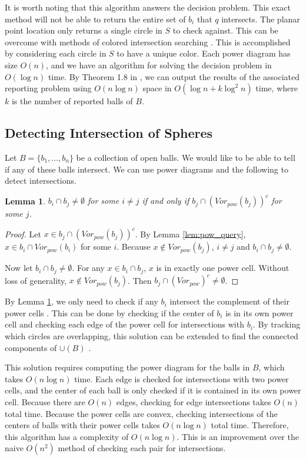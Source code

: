 \documentclass[a4paper, 11pt]{article}
\newtheorem{lemma}{Lemma}[section]
\begin{document}
It is worth noting that this algorithm answers the decision problem. This exact method will not be able to return the entire set of $b_i$ that $q$
intersects. The planar point location only returns a single circle in $S$ to check against. This can be overcome with methods of colored intersection
searching \cite{ravi}. This is accomplished by considering each circle in $S$ to have a unique color. Each power diagram has size $O(n)$, and we have
an algorithm for solving the decision problem in $O(\log n)$ time. By Theorem 1.8 in \cite{ravi}, we can output the results of the associated reporting problem using $O(n
\log n)$ space in $O(\log n +k \log^2 n)$ time, where $k$ is the number of reported balls of $B$.

\subsection{Detecting Intersection of Spheres}

Let $B = \{ b_1,\dots, b_n \}$ be a collection of open balls. We would like to be able to tell if any of these balls intersect. We can use power
diagrams and the following to detect intersections.

\begin{lemma}
  $b_i \cap b_j \neq \emptyset$ for some $i \neq j$ if and only if $b_j \cap (Vor_{pow}(b_j))^c$ for some $j$.
  \label{lem:ball_intersect}
\end{lemma}
\begin{proof}
  Let $x \in b_j \cap ( Vor_{pow}(b_j))^c$. By Lemma \ref{lem:pow_query}, $x \in b_i \cap Vor_{pow}(b_i)$ for some $i$. Because $x \not\in
  Vor_{pow}(b_j)$, $i \neq j$ and $b_i \cap b_j \neq \emptyset$.

  Now let $b_i \cap b_j \neq \emptyset$. For any $x \in b_i \cap b_j$, $x$ is in exactly one power cell. Without loss of generality, $x \not\in
  Vor_{pow}(b_j)$. Then $b_j \cap (Vor_{pow})^c \neq \emptyset$.
\end{proof}

By Lemma \ref{lem:ball_intersect}, we only need to check if any $b_i$ intersect the complement of their power cells \cite{aurenhammer_discs}. This can
be done by checking if the center of $b_i$ is in its own power cell and checking each edge of the power cell for intersections with $b_i$.
By tracking which circles are overlapping, this solution can be extended to find the connected components of $\cup (B)$ \cite{imai_power}.

This solution requires computing the power diagram for the balls in $B$, which takes $O(n \log n)$ time. Each edge is checked for intersections with
two power cells, and the center of each ball is only checked if it is contained in its own power cell. Because there are $O(n)$ edges, checking for
edge intersections takes $O(n)$ total time. Because the power cells are convex, checking intersections of the centers of balls with their power cells
takes $O(n \log n)$ total time. Therefore, this algorithm has a complexity of $O(n \log n)$. This is an improvement over the naive $O(n^2)$ method of
checking each pair for intersections.
\end{document}
